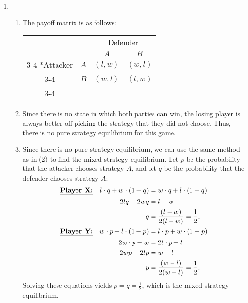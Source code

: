 \documentclass{article}
\begin{document}
\begin{enumerate}
    \item 
    \begin{enumerate}
        \item The payoff matrix is as follows:

        \begin{table}[H]
            \centering
            \setlength{\extrarowheight}{2pt}
            \begin{tabular}{cc|c|c|}
              & \multicolumn{1}{c}{} & \multicolumn{2}{c}{Defender}\\
              & \multicolumn{1}{c}{} & \multicolumn{1}{c}{$A$}  & \multicolumn{1}{c}{$B$} \\\cline{3-4}
              \multirow{2}*{Attacker}  & $A$ & $(l,w)$ & $(w,l)$ \\\cline{3-4}
              & $B$ & $(w,l)$ & $(l,w)$ \\\cline{3-4}
            \end{tabular}
        \end{table}
    
        \item Since there is no state in which both parties can win, the losing player is always better off picking the strategy that they did not choose. Thus, there is no pure strategy equilibrium for this game.
        
        \item Since there is no pure strategy equilibrium, we can use the same method as in (2) to find the mixed-strategy equilibrium. Let $p$ be the probability that the attacker chooses strategy $A$, and let $q$ be the probability that the defender chooses strategy $A$:
        \begin{align*}
            \textbf{\underline{Player X:}} && l\cdot q + w\cdot (1-q) & =w\cdot q + l\cdot (1-q) \\
            && 2lq-2wq & =l-w \\
            && q & =\frac{(l-w)}{2(l-w)}=\frac{1}{2}; \\
            \textbf{\underline{Player Y:}} && w\cdot p + l\cdot (1-p) & =l\cdot p + w\cdot (1-p) \\
            && 2w\cdot p - w & =2l\cdot p+l \\
            && 2wp-2lp & =w-l \\
            && p & =\frac{(w-l)}{2(w-l)}=\frac{1}{2}.
        \end{align*}
        Solving these equations yields $p=q=\frac{1}{2}$, which is the mixed-strategy equilibrium.


\end{enumerate}
\end{enumerate}
\end{document}
